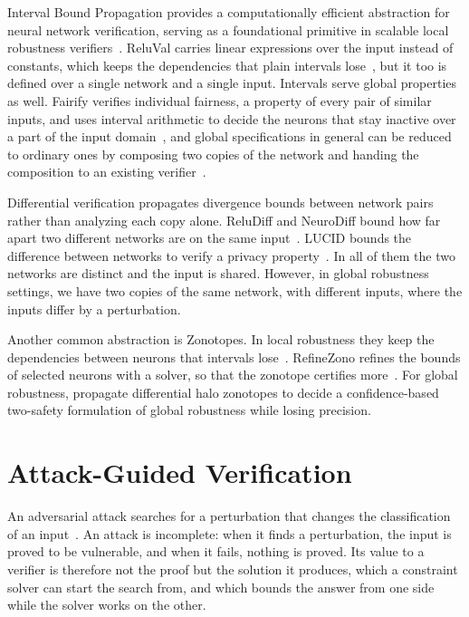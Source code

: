 Interval Bound Propagation provides a computationally efficient
abstraction for neural network verification,
serving as a foundational primitive in scalable
local robustness verifiers~\citep{liu2021algorithms}.
ReluVal carries linear expressions over the input instead of constants, which
keeps the dependencies that plain intervals lose~\citep{wang2018reluval},
but it too is defined over a single network and a single input.
Intervals serve global properties as well. Fairify verifies
individual fairness, a property of every pair of similar inputs, and
uses interval arithmetic to decide the neurons that stay inactive
over a part of the input domain~\citep{biswas2023fairify}, and global
specifications in general can be reduced to ordinary ones by
composing two copies of the network and handing the composition to an
existing verifier~\citep{boetius2023hyperproperties}.


Differential verification propagates divergence bounds between
network pairs rather than analyzing each copy alone.
ReluDiff and NeuroDiff bound how far apart two different networks are on the
same input~\citep{paulsen2020reludiff,paulsen2020neurodiff}.
LUCID bounds the difference between networks to verify a privacy
property~\citep{kabaha2025lucid}. In all of them the two networks are
distinct and the input is shared. However, in global robustness settings,
we have two copies of the same network, with different inputs,
where the inputs differ by a perturbation.

Another common abstraction is Zonotopes. In local robustness they keep the
dependencies between neurons that intervals
lose~\citep{singh2018fast,gehr2018}. RefineZono refines the bounds of
selected neurons with a solver, so that the zonotope certifies
more~\citep{singh2019refinezono}. For global robustness,
\citet{athavale2026differential} propagate differential halo zonotopes
to decide a confidence-based two-safety formulation of
global robustness while losing precision.

\section{Attack-Guided Verification}
\label{sec:related-attack-guided}

An adversarial attack searches for a perturbation that changes the
classification of an input~\citep{szegedy2014,carlini2017,madry2018}.
An attack is incomplete: when it finds a perturbation, the input is
proved to be vulnerable, and when it fails, nothing is proved. Its
value to a verifier is therefore not the proof but the solution it
produces, which a constraint solver can start the search from, and
which bounds the answer from one side while the solver works on the
other.

